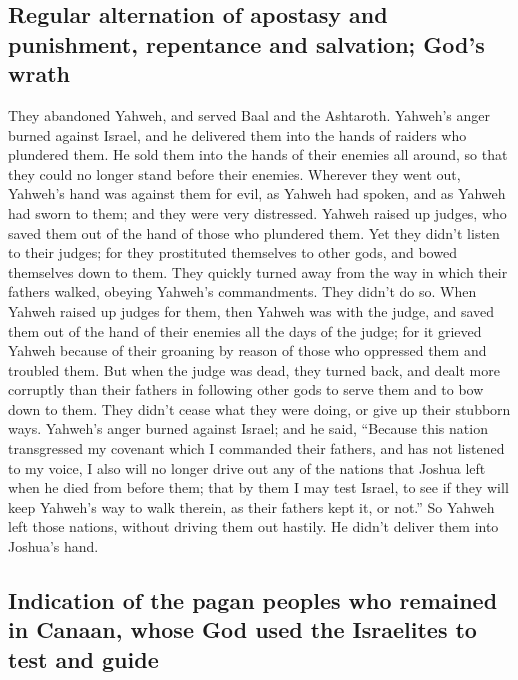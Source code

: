 \hypertarget{regular-alternation-of-apostasy-and-punishment-repentance-and-salvation-gods-wrath}{%
\subsection{Regular alternation of apostasy and punishment, repentance
and salvation; God's
wrath}\label{regular-alternation-of-apostasy-and-punishment-repentance-and-salvation-gods-wrath}}

 They abandoned Yahweh, and served Baal and the
Ashtaroth.  Yahweh's anger burned against Israel, and he
delivered them into the hands of raiders who plundered them. He sold
them into the hands of their enemies all around, so that they could no
longer stand before their enemies.  Wherever they went
out, Yahweh's hand was against them for evil, as Yahweh had spoken, and
as Yahweh had sworn to them; and they were very distressed.
 Yahweh raised up judges, who saved them out of the hand
of those who plundered them.  Yet they didn't listen to
their judges; for they prostituted themselves to other gods, and bowed
themselves down to them. They quickly turned away from the way in which
their fathers walked, obeying Yahweh's commandments. They didn't do so.
 When Yahweh raised up judges for them, then Yahweh was
with the judge, and saved them out of the hand of their enemies all the
days of the judge; for it grieved Yahweh because of their groaning by
reason of those who oppressed them and troubled them. 
But when the judge was dead, they turned back, and dealt more corruptly
than their fathers in following other gods to serve them and to bow down
to them. They didn't cease what they were doing, or give up their
stubborn ways.  Yahweh's anger burned against Israel; and
he said, ``Because this nation transgressed my covenant which I
commanded their fathers, and has not listened to my voice,
 I also will no longer drive out any of the nations that
Joshua left when he died from before them;  that by them
I may test Israel, to see if they will keep Yahweh's way to walk
therein, as their fathers kept it, or not.''  So Yahweh
left those nations, without driving them out hastily. He didn't deliver
them into Joshua's hand.

\hypertarget{indication-of-the-pagan-peoples-who-remained-in-canaan-whose-god-used-the-israelites-to-test-and-guide}{%
\subsection{Indication of the pagan peoples who remained in Canaan,
whose God used the Israelites to test and
guide}\label{indication-of-the-pagan-peoples-who-remained-in-canaan-whose-god-used-the-israelites-to-test-and-guide}}

